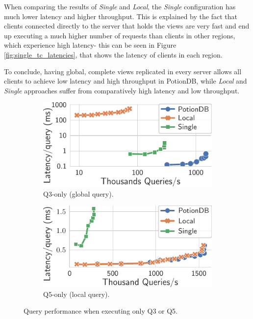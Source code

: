 \documentclass[sigplan,twocolumn,review,anonymous]{acmart}
\begin{document}
When comparing the results of \textit{Single} and \textit{Local}, the \textit{Single} configuration has much lower latency and higher throughput. This is explained by the fact that clients connected directly to the server that holds the views are very fast and 
end up executing a much higher number of requests than clients in other regions, which experience high latency- this can be 
seen in Figure \ref{fig:single_tc_latencies}, that shows the latency of clients in each region.

To conclude, having global, complete views replicated in every server allows all clients to achieve low latency and high throughput in PotionDB, while \textit{Local} and \textit{Single} approaches suffer from comparatively high latency and low throughput.



\begin{figure}
	\centering
	\begin{subfigure}{.49\linewidth}
		\includegraphics[width=1\linewidth]{singleQuery/q3_latency}
		\caption{Q3-only (global query).}
		\label{fig:q3_tc}
	\end{subfigure}%
	\hspace*{0.2em}
	\begin{subfigure}{.49\linewidth}
		\includegraphics[width=1\linewidth]{singleQuery/q5_latency}
		\caption{Q5-only (local query).}
		\label{fig:q5_tc}
	\end{subfigure}%
	\vspace*{-0.55em}
	\caption{Query performance when executing only Q3 or Q5.}
	\label{fig:q3_q5_tc}
	\vspace*{-1.1em}
\end{figure}
\end{document}
